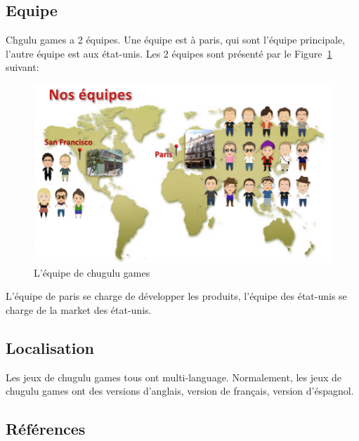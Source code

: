 
\subsection{Equipe} %
\label{sub:subsection_name}

Chgulu games a 2 équipes. Une équipe est à paris, qui sont l'équipe principale, l'autre équipe est aux état-unis. Les 2 équipes sont présenté par le Figure~\ref{fig:Image_EquipeChugulu} suivant:

\begin{figure}[htbp]
	\centering
		\includegraphics[width=6in]{Image/EquipeChugulu.png}
	\caption{L'équipe de chugulu games}
	\label{fig:Image_EquipeChugulu}
\end{figure}



L'équipe de paris se charge de développer les produits, l'équipe des état-unis se charge de la market des état-unis. 


\subsection{Localisation} %
\label{ssub:subsubsection_name}

Les jeux de chugulu games tous ont multi-language. Normalement, les jeux de chugulu games ont des versions d'anglais, version de français, version d'éspagnol. 


\subsection{Références} %
\label{ssub:références}

